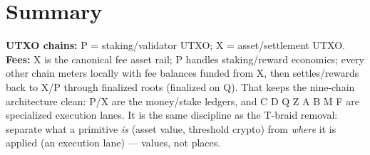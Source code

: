 \documentclass[11pt,letterpaper]{article}
\newcommand{\chain}[1]{\textsf{#1}}
\begin{document}
\section{Summary}

\textbf{UTXO chains:} \chain{P} = staking/validator UTXO; \chain{X} =
asset/settlement UTXO. \textbf{Fees:} \chain{X} is the canonical fee asset rail;
\chain{P} handles staking/reward economics; every other chain meters locally with
fee balances funded from \chain{X}, then settles/rewards back to \chain{X}/\chain{P}
through finalized roots (finalized on \chain{Q}). That keeps the nine-chain
architecture clean: \chain{P}/\chain{X} are the money/stake ledgers, and \chain{C}
\chain{D} \chain{Q} \chain{Z} \chain{A} \chain{B} \chain{M} \chain{F} are
specialized execution lanes. It is the same discipline as the \chain{T}-braid
removal: separate what a primitive \emph{is} (asset value, threshold crypto) from
\emph{where} it is applied (an execution lane) --- values, not places.
\end{document}
